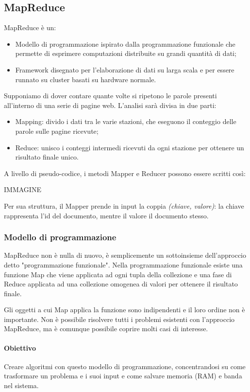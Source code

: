 \documentclass{article}
\begin{document}
\subsection{MapReduce}
MapReduce è un:
\begin{itemize}
    \item Modello di programmazione ispirato dalla programmazione funzionale che permette di esprimere computazioni distribuite su grandi quantità di dati;
    \item Framework disegnato per l'elaborazione di dati su larga scala e per essere runnato su cluster basati su hardware normale.
\end{itemize}

Supponiamo di dover contare quante volte si ripetono le parole presenti all'interno di una serie di pagine web. L'analisi sarà divisa in due parti:
\begin{itemize}
    \item Mapping: divido i dati tra le varie stazioni, che eseguono il conteggio delle parole sulle pagine ricevute;
    \item Reduce: unisco i conteggi intermedi ricevuti da ogni stazione per ottenere un risultato finale unico.
\end{itemize}

A livello di pseudo-codice, i metodi Mapper e Reducer possono essere scritti così:

IMMAGINE

Per sua struttura, il Mapper prende in input la coppia \textit{(chiave, valore)}: la chiave rappresenta l'id del documento, mentre il valore il documento stesso. 

\subsubsection{Modello di programmazione} MapReduce non è nulla di nuovo, è semplicemente un sottoinsieme dell'approccio detto "programmazione funzionale". 
Nella programmazione funzionale esiste una funzione Map che viene applicata ad ogni tupla della collezione e una fase di Reduce applicata ad una collezione omogenea di valori per ottenere il risultato finale. 

Gli oggetti a cui Map applica la funzione sono indipendenti e il loro ordine non è importante.
Non è possibile risolvere tutti i problemi esistenti con l'approccio MapReduce, ma è comunque possibile coprire molti casi di interesse. 

\paragraph*{Obiettivo} Creare algoritmi con questo modello di programmazione, concentrandosi su come trasformare un problema e i suoi input e come salvare memoria (RAM) e banda nel sistema. 
\end{document}

